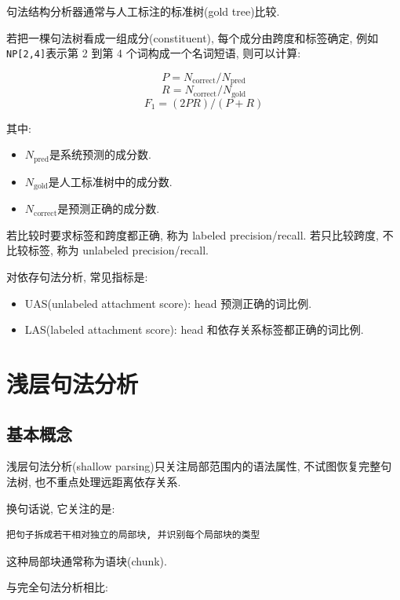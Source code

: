 句法结构分析器通常与人工标注的标准树(gold tree)比较.

若把一棵句法树看成一组成分(constituent), 每个成分由跨度和标签确定,
例如\texttt{NP[2,4]}表示第 2 到第 4 个词构成一个名词短语, 则可以计算:

\[
P = N_{\operatorname{correct}} / N_{\operatorname{pred}}
\]
\[
R = N_{\operatorname{correct}} / N_{\operatorname{gold}}
\]
\[
F_1 = (2 P R) / (P + R)
\]

其中:

\begin{itemize}
\item $N_{\operatorname{pred}}$是系统预测的成分数.
\item $N_{\operatorname{gold}}$是人工标准树中的成分数.
\item $N_{\operatorname{correct}}$是预测正确的成分数.
\end{itemize}

若比较时要求标签和跨度都正确, 称为 labeled precision/recall.
若只比较跨度, 不比较标签, 称为 unlabeled precision/recall.

对依存句法分析, 常见指标是:

\begin{itemize}
\item UAS(unlabeled attachment score): head 预测正确的词比例.
\item LAS(labeled attachment score): head 和依存关系标签都正确的词比例.
\end{itemize}

\section{浅层句法分析}


\subsection{基本概念}


浅层句法分析(shallow parsing)只关注局部范围内的语法属性,
不试图恢复完整句法树, 也不重点处理远距离依存关系.

换句话说, 它关注的是:

\begin{Verbatim}[breaklines=true,breakanywhere=true,fontsize=\small]
把句子拆成若干相对独立的局部块, 并识别每个局部块的类型
\end{Verbatim}

这种局部块通常称为语块(chunk).

与完全句法分析相比:

